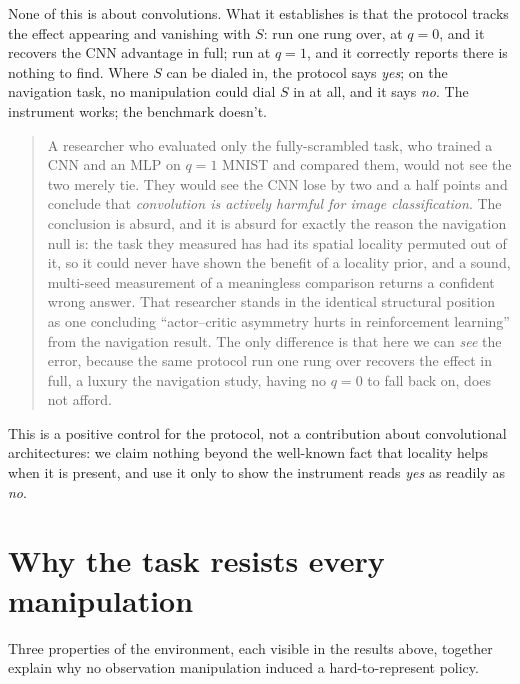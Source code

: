 \documentclass[10pt]{article}
\begin{document}
None of this is about convolutions. What it establishes is that the protocol tracks the
effect appearing and vanishing with $S$: run one rung over, at $q=0$, and it
recovers the CNN advantage in full; run at $q=1$, and it correctly reports there is nothing
to find. Where $S$ can be dialed in, the protocol says \emph{yes}; on the navigation task, no
manipulation could dial $S$ in at all, and it says \emph{no}. The instrument works;
the benchmark doesn't.

\begin{quote}
A researcher who evaluated only the fully-scrambled task, who trained a CNN and an MLP on
$q=1$ MNIST and compared them, would not see the two merely tie. They would see the CNN lose
by two and a half points and conclude that \emph{convolution is actively harmful for image
classification}. The conclusion is absurd, and it is absurd for exactly the reason the
navigation null is: the task they measured has had its spatial locality permuted out of it,
so it could never have shown the benefit of a locality prior, and a sound, multi-seed
measurement of a meaningless comparison returns a confident wrong answer. That researcher
stands in the identical structural position as one concluding ``actor--critic asymmetry hurts
in reinforcement learning'' from the navigation result. The only difference is that here we
can \emph{see} the error, because the same protocol run one rung over recovers the effect in
full, a luxury the navigation study, having no $q=0$ to fall back on, does not afford.
\end{quote}

This is a positive control for the protocol, not a contribution about convolutional
architectures: we claim nothing beyond the well-known fact that locality helps when it is
present, and use it only to show the instrument reads \emph{yes} as readily as \emph{no}.

\section{Why the task resists every manipulation}
\label{sec:why}

Three properties of the environment, each visible in the results above, together explain why
no observation manipulation induced a hard-to-represent policy.
\end{document}
